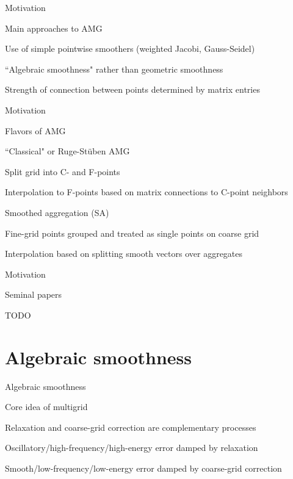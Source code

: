 \documentclass[18pt,xcolor=table]{beamer}
\begin{document}
\begin{frame}{Motivation}
\begin{block}{Main approaches to AMG}
\bit
\item Use of simple pointwise smoothers (weighted Jacobi, Gauss-Seidel)
\item ``Algebraic smoothness" rather than geometric smoothness
\item Strength of connection between points determined by matrix entries
\eit
\end{block}
\end{frame}

\begin{frame}{Motivation}
\begin{block}{Flavors of AMG}
\bit
\item ``Classical" or Ruge-St\"uben AMG
\bit
\item Split grid into C- and F-points
\item Interpolation to F-points based on matrix connections to C-point neighbors
\eit
\item Smoothed aggregation (SA)
\bit
\item Fine-grid points grouped and treated as single points on coarse grid
\item Interpolation based on splitting smooth vectors over aggregates
\eit
\eit
\end{block}
\end{frame}

\begin{frame}{Motivation}
\begin{block}{Seminal papers}
\bit
\item TODO
\eit
\end{block}
\end{frame}



\section{Algebraic smoothness}

\begin{frame}{Algebraic smoothness}
\begin{block}{Core idea of multigrid}
\bit
\item Relaxation and coarse-grid correction are complementary processes
\item Oscillatory/high-frequency/high-energy error damped by relaxation
\item Smooth/low-frequency/low-energy error damped by coarse-grid correction
\eit
\end{block}
\end{frame}
\end{document}
